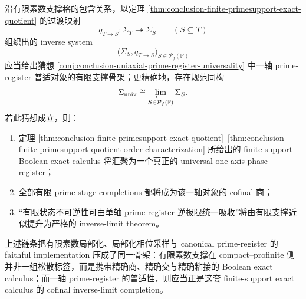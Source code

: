\begin{conjecture}\label{conj:conclusion-finite-primesupport-universal-inverse-limit-solenoid}
沿有限素数支撑格的包含关系，以定理 \ref{thm:conclusion-finite-primesupport-exact-quotient} 的过渡映射
\[
q_{T\to S}:\Sigma_T\twoheadrightarrow \Sigma_S
\qquad (S\subseteq T)
\]
组织出的 inverse system
\[
\bigl(\Sigma_S,q_{T\to S}\bigr)_{S\in \mathcal P_f(\mathbb P)}
\]
应当给出猜想 \ref{conj:conclusion-uniaxial-prime-register-universality} 中一轴 prime-register 普适对象的有限支撑骨架；更精确地，存在规范同构
\[
\Sigma_{\mathrm{univ}}
\cong
\varprojlim_{S\in \mathcal P_f(\mathbb P)}\Sigma_S.
\]
若此猜想成立，则：
\begin{enumerate}
  \item 定理 \ref{thm:conclusion-finite-primesupport-exact-quotient}--\ref{thm:conclusion-finite-primesupport-quotient-order-characterization} 所给出的 finite-support Boolean exact calculus 将汇聚为一个真正的 universal one-axis phase register；
  \item 全部有限 prime-stage completions 都将成为该一轴对象的 cofinal 商；
  \item “有限状态不可逆性可由单轴 prime-register 逆极限统一吸收”将由有限支撑近似提升为严格的 inverse-limit theorem。
\end{enumerate}
\end{conjecture}

上述链条把有限素数局部化、局部化相位采样与 canonical prime-register 的 faithful implementation 压成了同一骨架：有限素数支撑在 compact--profinite 侧并非一组松散标签，而是携带精确商、精确交与精确粘接的 Boolean exact calculus；而一轴 prime-register 的普适性，则应当正是这套 finite-support exact calculus 的 cofinal inverse-limit completion。
